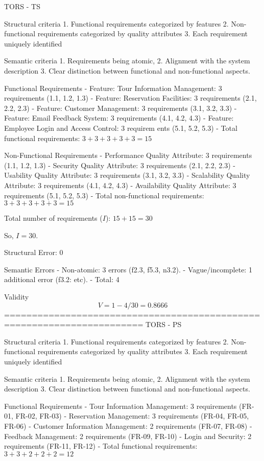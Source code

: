 TORS - TS

Structural criteria 
1. Functional requirements categorized by features
2. Non-functional requirements categorized by quality attributes
3. Each requirement uniquely identified

Semantic criteria
1. Requirements being atomic, 
2. Alignment with the system description
3. Clear distinction between functional and non-functional aspects. 

Functional Requirements
- Feature: Tour Information Management: 3 requirements (1.1, 1.2, 1.3)
- Feature: Reservation Facilities: 3 requirements (2.1, 2.2, 2.3)
- Feature: Customer Management: 3 requirements (3.1, 3.2, 3.3)
- Feature: Email Feedback System: 3 requirements (4.1, 4.2, 4.3)
- Feature: Employee Login and Access Control: 3 requirem ents (5.1, 5.2, 5.3)
- Total functional requirements: \( 3 + 3 + 3 + 3 + 3 = 15 \)

Non-Functional Requirements
- Performance Quality Attribute: 3 requirements (1.1, 1.2, 1.3)
- Security Quality Attribute: 3 requirements (2.1, 2.2, 2.3)
- Usability Quality Attribute: 3 requirements (3.1, 3.2, 3.3)
- Scalability Quality Attribute: 3 requirements (4.1, 4.2, 4.3)
- Availability Quality Attribute: 3 requirements (5.1, 5.2, 5.3)
- Total non-functional requirements: \( 3 + 3 + 3 + 3 + 3 = 15 \)

Total number of requirements (\( I \)): \( 15 + 15 = 30 \)

So, \( I = 30 \).

Structural Error: 0

Semantic Errors
- Non-atomic: 3 errors (f2.3, f5.3, n3.2).
- Vague/incomplete: 1 additional error (f3.2: etc).
- Total: 4

Validity
\[
V = 1 - 4/30 = 0.8666
\]
=======================================================================
 TORS - PS
 
 Structural criteria 
 1. Functional requirements categorized by features
 2. Non-functional requirements categorized by quality attributes
 3. Each requirement uniquely identified
 
 Semantic criteria
 1. Requirements being atomic, 
 2. Alignment with the system description
 3. Clear distinction between functional and non-functional aspects. 
 
 Functional Requirements
 - Tour Information Management: 3 requirements (FR-01, FR-02, FR-03)
 - Reservation Management: 3 requirements (FR-04, FR-05, FR-06)
 - Customer Information Management: 2 requirements (FR-07, FR-08)
 - Feedback Management: 2 requirements (FR-09, FR-10)
 - Login and Security: 2 requirements (FR-11, FR-12)
 - Total functional requirements: \( 3 + 3 + 2 + 2 + 2 = 12 \)
 

